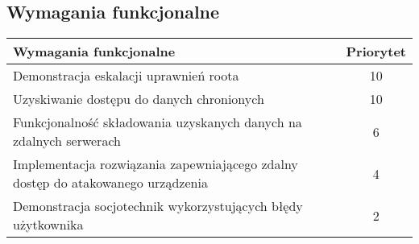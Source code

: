 \subsection{Wymagania funkcjonalne}
\begin{tabular}{|p{12cm}|c|}
\hline
    \textbf{Wymagania funkcjonalne} &
    \textbf{Priorytet} \\ 
\hline
    Demonstracja eskalacji uprawnień roota &
    10 \\
\hline
    Uzyskiwanie dostępu do danych chronionych &
    10 \\
\hline
    Funkcjonalność składowania uzyskanych danych na zdalnych serwerach &
    6 \\
\hline
    Implementacja rozwiązania zapewniającego zdalny dostęp do atakowanego urządzenia &
    4 \\
\hline
    Demonstracja socjotechnik wykorzystujących błędy użytkownika &
    2 \\
\hline
\end{tabular}
